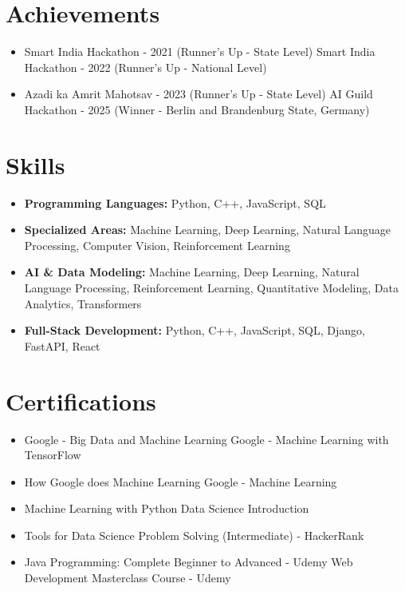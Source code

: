 \documentclass[a4paper,10pt]{article}
\begin{document}
\section*{Achievements}
\begin{itemize}
\item Smart India Hackathon - 2021 (Runner's Up - State Level) \hfill Smart India Hackathon - 2022 (Runner's Up - National Level)
\item Azadi ka Amrit Mahotsav - 2023 (Runner's Up - State Level) \hfill AI Guild Hackathon - 2025 (Winner - Berlin and Brandenburg State, Germany)
\end{itemize}

\section*{Skills}
\begin{itemize}
  \item \textbf{Programming Languages:} Python, C++, JavaScript, SQL
  \item \textbf{Specialized Areas:} Machine Learning, Deep Learning, Natural Language Processing, Computer Vision, Reinforcement Learning
  \item \textbf{AI \& Data Modeling:} Machine Learning, Deep Learning, Natural Language Processing, Reinforcement Learning, Quantitative Modeling, Data Analytics, Transformers
  \item \textbf{Full-Stack Development:} Python, C++, JavaScript, SQL, Django, FastAPI, React
\end{itemize}

\section*{Certifications}
\begin{itemize}
\item Google - Big Data and Machine Learning \hfill Google - Machine Learning with TensorFlow
\item How Google does Machine Learning \hfill Google - Machine Learning
\item Machine Learning with Python \hfill Data Science Introduction
\item Tools for Data Science \hfill Problem Solving (Intermediate) - HackerRank
\item Java Programming: Complete Beginner to Advanced - Udemy \hfill Web Development Masterclass Course - Udemy
\end{itemize}
\end{document}
